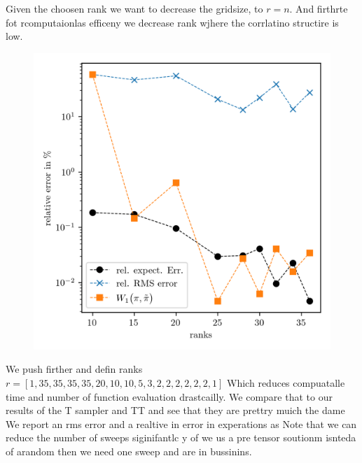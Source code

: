 Given the choosen rank we want to decrease the gridsize, to $r =n$.
And firthrte fot rcomputaionlas efficeny we decrease rank wjhere the corrlatino structire is low.
\begin{figure}[h]%
	\includegraphics[]{findRank.png}
	\caption[Find Grid]{}
	\label{fig:FindGrid}
\end{figure}
\clearpage

We push firther and defin ranks $r = [ 1, 35,  35, 35, 35, 20, 10, 10, 5, 3, 2, 2, 2, 2, 2, 2, 1]$
Which reduces compuatalle time and number of function evaluation drastcailly.
We compare that to our results of the T sampler and TT and see that they are prettry muich the dame
We report an rms error and a realtive in error in experations as 
Note that we can reduce the number of sweeps siginifantlc y of we us a pre tensor soutionm isnteda of arandom 
then we need one sweep and are in bussinins.


